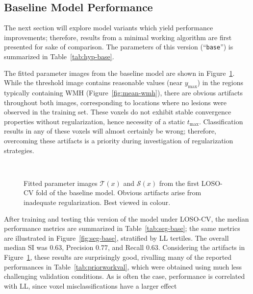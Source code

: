 \subsection{Baseline Model Performance}\label{ss:exp-base}
The next section will explore model variants which yield performance improvements;
therefore, results from a minimal working algorithm are first presented for sake of comparison.
The parameters of this version (``\texttt{base}'') is summarized in Table~\ref{tab:hyp-base}.
\par
The fitted parameter images from the baseline model
are shown in Figure~\ref{fig:beta-base}.
While the threshold image contains reasonable values (near $y_{\max}$)
in the regions typically containing WMH (Figure~\ref{fig:mean-wmh}),
there are obvious artifacts throughout both images,
corresponding to locations where no lesions were observed in the training set.
These voxels do not exhibit stable convergence properties without regularization,
hence necessity of a static $t_{\max}$.
Classification results in any of these voxels will almost certainly be wrong;
therefore, overcoming these artifacts is a priority
during investigation of regularization strategies.
\par
\begin{figure}
  \centering
  \\[0.5em]
  \caption{Fitted parameter images $\mathcal{T}(x)$ and $\mathcal{S}(x)$
    from the first LOSO-CV fold of the baseline model.
    Obvious artifacts arise from inadequate regularization.
    Best viewed in colour.}%
  \label{fig:beta-base}
\end{figure}
After training and testing this version of the model under LOSO-CV,
the median performance metrics are summarized in Table~\ref{tab:seg-base};
the same metrics are illustrated in Figure~\ref{fig:seg-base}, stratified by LL tertiles.
The overall median SI was 0.63, Precision 0.77, and Recall 0.63.
Considering the artifacts in Figure~\ref{fig:beta-base},
these results are surprisingly good,
rivalling many of the reported performances in Table~\ref{tab:priorworkval},
which were obtained using much less challenging validation conditions.
As is often the case, performance is correlated with LL,
since voxel misclassifications have a larger effect
